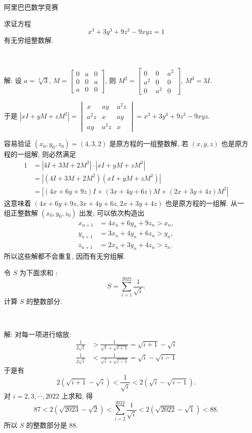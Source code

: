 \newpage
\noindent 阿里巴巴数学竞赛

求证方程
\[x^3+3y^3+9z^3-9xyz=1 \]
有无穷组整数解.

~

解: 设 $a = \sqrt[3]{3}$, $M = \begin{bmatrix}
0 & a & 0 \\
0 & 0 & a \\
a & 0 & 0
\end{bmatrix}$, 则 $M^2 = \begin{bmatrix}
0 & 0 & a^2 \\
a^2 & 0 & 0 \\
0 & a^2 & 0
\end{bmatrix}$, $M^3=3I$.

于是 $|xI + yM + zM^2| = \begin{vmatrix}
x & ay & a^2z \\
a^2z & x & ay \\
ay & a^2z & x
\end{vmatrix} = x^3+3y^3+9z^3-9xyz $.

容易验证 $(x_0,y_0,z_0) = (4,3,2)$ 是原方程的一组整数解, 若 $(x,y,z)$ 也是原方程的一组解, 则必然满足
\begin{align*}
1 &= |4I + 3M + 2M^2|\cdot |xI+yM+zM^2|\\
&= |(4I + 3M + 2M^2)(xI + yM + zM^2)|\\
&= |(4x+6y+9z)I + (3x+4y+6z)M + (2x+3y+4z)M^2|
\end{align*}
这意味着 $(4x+6y+9z, 3x+4y+6z, 2x+3y+4z)$ 也是原方程的一组解. 从一组正整数解 $(x_0, y_0, z_0)$ 出发, 可以依次构造出
\begin{align*}
x_{n+1} &= 4x_n+6y_n+9z_n > x_n,\\
y_{n+1} &= 3x_n+4y_n+6z_n > y_n, \\ 
z_{n+1} &= 2x_n+3y_n+4z_n > z_n.
\end{align*}
所以这些解都不会重复, 因而有无穷组解.

\newpage

令 $S$ 为下面求和 :
\[S = \sum_{i=1}^{2022}{\frac{1}{\sqrt{i}}} .\]
计算 $S$ 的整数部分.

~

解: 对每一项进行缩放:
\begin{align*}
\frac{1}{2\sqrt{i}} &> \frac{1}{\sqrt{i}+\sqrt{i+1}} = \sqrt{i+1}-\sqrt{i} \\
\frac{1}{2\sqrt{i}} &< \frac{1}{\sqrt{i}+\sqrt{i-1}} = \sqrt{i}-\sqrt{i-1}
\end{align*}
于是有
\[2(\sqrt{i+1} - \sqrt{i}) < \frac{1}{\sqrt{i}} < 2(\sqrt{i} - \sqrt{i - 1}) .\]
对 $i=2,3,\cdots,2022$ 上求和, 得
\[87 < 2(\sqrt{2023} - \sqrt{2}) < \sum_{i=2}^{2022}{\frac{1}{\sqrt{i}}} < 2(\sqrt{2022} - \sqrt{1}) < 88 .\]
所以 $S$ 的整数部分是 88.


